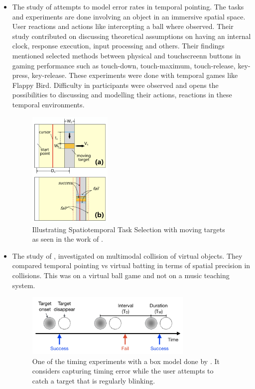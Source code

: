 \documentclass{article}
\begin{document}
\begin{itemize}
\item The study of \cite{lee2016modelling} attempts to model error rates in temporal pointing. The tasks and experiments are done involving an object in an immersive spatial space. User reactions and actions like intercepting a ball where observed. Their study contributed on discussing theoretical assumptions on having an internal clock, response execution, input processing and others. Their findings mentioned selected methods between physical and touchscreenn buttons in gaming performance such as touch-down, touch-maximum, touch-release, key-press, key-release. These experiments were done with temporal games like Flappy Bird. Difficulty in participants were observed and opens the possibilities to discussing and modelling their actions, reactions in these temporal environments.
\begin{figure}[t]
\centering
 \includegraphics[width=4cm]{figures/spatiotemporalmovingtargetselection.png}
    \caption{Illustrating Spatiotemporal Task Selection with moving targets as seen in the work of \cite{lee2016modelling}.
 }\label{fig:spatiotemporaltask}
\end{figure}
\item The study of \cite{lee2017boxer}, investigated on multimodal collision of virtual objects. They compared temporal pointing vs virtual batting in terms of spatial precision in collisions. This was on a virtual ball game and not on a music teaching system.

\begin{figure}[t]
\centering
 \includegraphics[width=8cm]{figures/boxmodel.png}
    \caption{One of the timing experiments with a box model done by \cite{lee2017boxer}. It considers capturing timing error while the user attempts to catch a target that is regularly blinking.
 }\label{fig:boxmodel}
\end{figure}


\end{itemize}
\end{document}
